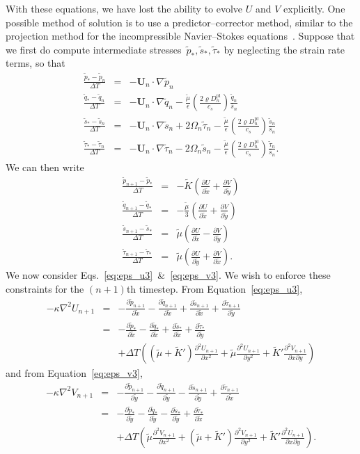 \documentclass[12pt]{article}
\newcommand{\p}{\partial}
\newcommand{\Dpl}{D^\textrm{pl}}
\newcommand{\xT}{\tilde{x}}
\newcommand{\yT}{\tilde{y}}
\newcommand{\KT}{\tilde{K}}
\newcommand{\pT}{\tilde{p}}
\newcommand{\sT}{\tilde{s}}
\newcommand{\qT}{\tilde{q}}
\newcommand{\tauT}{\tilde{\tau}}
\newcommand{\muT}{\tilde{\mu}}
\newcommand{\prxT}[1]{\frac{\p #1}{\p \xT}}
\newcommand{\pryT}[1]{\frac{\p #1}{\p \yT}}
\newcommand{\bs}{\bar{s}}
\renewcommand{\vec}[1]{\mathbf{#1}}
\begin{document}
With these equations, we have lost the ability to evolve $U$ and $V$
explicitly. One possible method of solution is to use a predictor--corrector
method, similar to the projection method for the incompressible Navier--Stokes
equations~\cite{chorin68}. Suppose that we first do compute intermediate
stresses~$\pT_*,\sT_*,\tauT_*$ by neglecting the strain rate terms, so that
\begin{eqnarray}
  \frac{\pT_*-\pT_n}{\Delta T} &=& -\vec{U}_n\cdot\nabla \pT_n \\
  \frac{\qT_*-\qT_n}{\Delta T} &=& -\vec{U}_n\cdot\nabla \qT_n - \frac{\muT}{\epsilon} \left(\frac{2 \varrho \Dpl_n}{c_s}\right) \frac{\qT_n}{\bs_n}\\  
  \frac{\sT_*-\sT_n}{\Delta T} &=& -\vec{U}_n\cdot\nabla \sT_n + 2\Omega_n \tauT_n - \frac{\muT}{\epsilon} \left(\frac{2 \varrho \Dpl_n}{c_s}\right) \frac{\sT_n}{\bs_n} \\
  \frac{\tauT_*-\tauT_n}{\Delta T} &=& -\vec{U}_n\cdot\nabla \tauT_n - 2\Omega_n \sT_n - \frac{\muT}{\epsilon} \left(\frac{2 \varrho \Dpl_n}{c_s}\right) \frac{\tauT_n}{\bs_n}.
\end{eqnarray}
We can then write
\begin{eqnarray}
  \label{eq:proj_start} \frac{\pT_{n+1}-\pT_*}{\Delta T} &=& - \KT \left(\prxT{U} +\pryT{V}\right) \\
  \frac{\qT_{n+1}-\qT_*}{\Delta T} &=& - \frac{\muT}{3} \left(\prxT{U} +\pryT{V}\right) \\
  \frac{\sT_{n+1}-\sT_*}{\Delta T} &=& \muT \left( \prxT{U} - \pryT{V} \right)  \\
  \label{eq:proj_end} \frac{\tauT_{n+1}-\tauT_*}{\Delta T} &=& \muT \left( \pryT{U} + \prxT{V} \right).
\end{eqnarray}
We now consider Eqs.~\ref{eq:eps_u3}~\&~\ref{eq:eps_v3}. We wish to enforce these
constraints for the $(n+1)$th timestep. From Equation~\ref{eq:eps_u3},
\begin{eqnarray*}
  -\kappa \nabla^2 U_{n+1} &=& -\prxT{\pT_{n+1}}-\prxT{\qT_{n+1}}+\prxT{\sT_{n+1}}+\pryT{\tauT_{n+1}}\\
  &=& -\prxT{\pT_*}-\prxT{\qT_*}+\prxT{\sT_*}+\pryT{\tauT_*} \\
  &&+\Delta T \left( (\muT+\KT') \frac{\p^2 U_{n+1}}{\p x^2} + \muT \frac{\p^2 U_{n+1}}{\p y^2} + \KT' \frac{\p^2 V_{n+1}}{\p x \p y} \right)
\end{eqnarray*}
and from Equation~\ref{eq:eps_v3},
\begin{eqnarray*}
  -\kappa \nabla^2 V_{n+1} &=& -\pryT{\pT_{n+1}}-\pryT{\qT_{n+1}}-\pryT{\sT_{n+1}}+\prxT{\tauT_{n+1}}\\
  &=& -\pryT{\pT_*}-\pryT{\qT_*}-\pryT{\sT_*}+\prxT{\tauT_*} \\
  && +\Delta T \left( \muT \frac{\p^2 V_{n+1}}{\p x^2} + (\muT+\KT') \frac{\p^2 V_{n+1}}{\p y^2} + \KT' \frac{\p^2 U_{n+1}}{\p x \p y} \right).
\end{eqnarray*}
\end{document}

